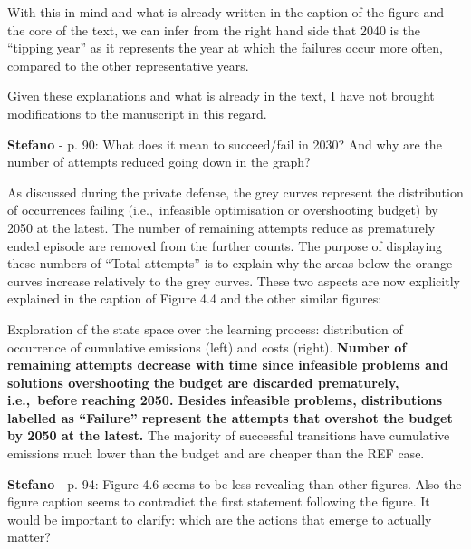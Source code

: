 \documentclass[12pt,a4paper]{article}
\def\ie{i.e.,\ }
\begin{document}
With this in mind and what is already written in the caption of the figure and the core of the text, we can infer from the right hand side that 2040 is the ``tipping year'' as it represents the year at which the failures occur more often, compared to the other representative years. 

Given these explanations and what is already in the text, I have not brought modifications to the manuscript in this regard.

\begin{mdframed}[style=comment] %
{\color{orange} \textbf{Stefano}} - p. 90: What does it mean to succeed/fail in 2030? And why are the number of attempts reduced going down in the graph?
\end{mdframed}

\noindent As discussed during the private defense, the grey curves represent the distribution of occurrences failing (\ie infeasible optimisation or overshooting  budget) by 2050 at the latest. The number of remaining attempts reduce as prematurely ended episode are removed from the further counts. The purpose of displaying these numbers of ``Total attempts'' is to explain why the areas below the orange curves increase relatively to the grey curves. These two aspects are now explicitly explained {\color{blue}in the caption of Figure 4.4 and the other similar figures}:

\begin{mdframed}[style=manuscript] %
Exploration of the state space over the learning process: distribution of occurrence of cumulative emissions (left) and costs (right). \textbf{Number of remaining attempts decrease with time since infeasible problems and solutions overshooting the  budget are discarded prematurely, \ie before reaching 2050. Besides infeasible problems, distributions labelled as ``Failure'' represent the attempts that overshot the  budget by 2050 at the latest.} The majority of successful transitions have cumulative emissions much lower than the  budget and are cheaper than the REF case. 
\end{mdframed}

\begin{mdframed}[style=comment] %
{\color{orange} \textbf{Stefano}} - p. 94: Figure 4.6 seems to be less revealing than other figures. Also the figure caption seems to contradict the first statement following the figure. It would be important to clarify: which are the actions that emerge to actually matter?
\end{mdframed}
\end{document}
